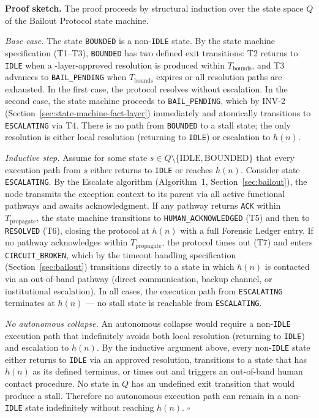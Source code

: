 \bigskip
\noindent
\textbf{Proof sketch.} The proof proceeds by structural induction over the state space $Q$ of the Bailout Protocol state machine.

\medskip
\noindent
\textit{Base case.} The state \texttt{BOUNDED} is a non-\texttt{IDLE} state. By the state machine specification (T1–T3), \texttt{BOUNDED} has two defined exit transitions: T2 returns to \texttt{IDLE} when a \fact-layer-approved resolution is produced within $T_{\text{bounds}}$, and T3 advances to \texttt{BAIL\_PENDING} when $T_{\text{bounds}}$ expires or all resolution paths are exhausted. In the first case, the protocol resolves without escalation. In the second case, the state machine proceeds to \texttt{BAIL\_PENDING}, which by INV-2 (Section~\ref{sec:state-machine-fact-layer}) immediately and atomically transitions to \texttt{ESCALATING} via T4. There is no path from \texttt{BOUNDED} to a stall state; the only resolution is either local resolution (returning to \texttt{IDLE}) or escalation to $h(n)$.

\medskip
\noindent
\textit{Inductive step.} Assume for some state $s \in Q \setminus \{\text{IDLE}, \text{BOUNDED}\}$ that every execution path from $s$ either returns to \texttt{IDLE} or reaches $h(n)$. Consider state \texttt{ESCALATING}. By the Escalate algorithm (Algorithm~1, Section~\ref{sec:bailout}), the node transmits the exception context to its parent via all active functional pathways and awaits acknowledgment. If any pathway returns \texttt{ACK} within $T_{\text{propagate}}$, the state machine transitions to \texttt{HUMAN\_ACKNOWLEDGED} (T5) and then to \texttt{RESOLVED} (T6), closing the protocol at $h(n)$ with a full Forensic Ledger entry. If no pathway acknowledges within $T_{\text{propagate}}$, the protocol times out (T7) and enters \texttt{CIRCUIT\_BROKEN}, which by the timeout handling specification (Section~\ref{sec:bailout}) transitions directly to a state in which $h(n)$ is contacted via an out-of-band pathway (direct communication, backup channel, or institutional escalation). In all cases, the execution path from \texttt{ESCALATING} terminates at $h(n)$ — no stall state is reachable from \texttt{ESCALATING}.

\medskip
\noindent
\textit{No autonomous collapse.} An autonomous collapse would require a non-\texttt{IDLE} execution path that indefinitely avoids both local resolution (returning to \texttt{IDLE}) and escalation to $h(n)$. By the inductive argument above, every non-\texttt{IDLE} state either returns to \texttt{IDLE} via an approved resolution, transitions to a state that has $h(n)$ as its defined terminus, or times out and triggers an out-of-band human contact procedure. No state in $Q$ has an undefined exit transition that would produce a stall. Therefore no autonomous execution path can remain in a non-\texttt{IDLE} state indefinitely without reaching $h(n)$. $\square$

